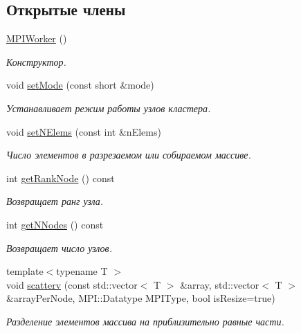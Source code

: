 \subsection*{Открытые члены}
\begin{DoxyCompactItemize}
\item 
\hyperlink{classMPIWorker_a28516cb1c7e14363d919523b316fe782}{M\-P\-I\-Worker} ()
\begin{DoxyCompactList}\small\item\em Конструктор. \end{DoxyCompactList}\item 
void \hyperlink{classMPIWorker_aaecd47e33ac7765ef53bef7a5d4a7a23}{set\-Mode} (const short \&mode)
\begin{DoxyCompactList}\small\item\em Устанавливает режим работы узлов кластера. \end{DoxyCompactList}\item 
void \hyperlink{classMPIWorker_af0f212025c0a57a3822487bd26dae1a3}{set\-N\-Elems} (const int \&n\-Elems)
\begin{DoxyCompactList}\small\item\em Число элементов в разрезаемом или собираемом массиве. \end{DoxyCompactList}\item 
int \hyperlink{classMPIWorker_a552cfd0819b82b558e102042c501c8f5}{get\-Rank\-Node} () const 
\begin{DoxyCompactList}\small\item\em Возвращает ранг узла. \end{DoxyCompactList}\item 
int \hyperlink{classMPIWorker_acb068493ae10f06715ceb6e00a0c09af}{get\-N\-Nodes} () const 
\begin{DoxyCompactList}\small\item\em Возвращает число узлов. \end{DoxyCompactList}\item 
{\footnotesize template$<$typename T $>$ }\\void \hyperlink{classMPIWorker_a451e1e641cd003724f73d667e784cdd5}{scatterv} (const std\-::vector$<$ T $>$ \&array, std\-::vector$<$ T $>$ \&array\-Per\-Node, M\-P\-I\-::\-Datatype M\-P\-I\-Type, bool is\-Resize=true)
\begin{DoxyCompactList}\small\item\em Разделение элементов массива на приблизительно равные части. \end{DoxyCompactList}\item 

\end{DoxyCompactItemize}
